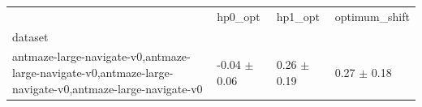\begin{tabular}{llll}
\toprule
 & hp0_opt & hp1_opt & optimum_shift \\
dataset &  &  &  \\
\midrule
antmaze-large-navigate-v0,antmaze-large-navigate-v0,antmaze-large-navigate-v0,antmaze-large-navigate-v0 & -0.04 $\pm$ 0.06 & 0.26 $\pm$ 0.19 & 0.27 $\pm$ 0.18 \\
\bottomrule
\end{tabular}
